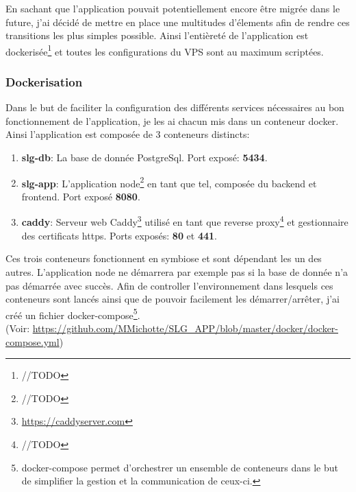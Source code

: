 \newpara

En sachant que l'application pouvait potentiellement encore être migrée dans le future, j'ai décidé de mettre en place une multitudes d'élements afin de rendre ces transitions les plus simples possible. Ainsi l'entièreté de l'application est dockerisée\footnote{//TODO} et toutes les configurations du VPS sont au maximum scriptées. 

\subsubsection{Dockerisation}
Dans le but de faciliter la configuration des différents services nécessaires au bon fonctionnement de l'application, je les ai chacun mis dans un conteneur docker. Ainsi l'application est composée de 3 conteneurs distincts: 

\newpara

\begin{enumerate}
  \item \textbf{slg-db}: La base de donnée PostgreSql. Port exposé: \textbf{5434}.
  \item \textbf{slg-app}: L'application node\footnote{//TODO} en tant que tel, composée du backend et frontend. Port exposé \textbf{8080}. 
  \item \textbf{caddy}: Serveur web Caddy\footnote{\url{https://caddyserver.com}} utilisé en tant que reverse proxy\footnote{//TODO} et gestionnaire des certificats https. Ports exposés: \textbf{80} et \textbf{441}.
\end{enumerate}

\newpage

Ces trois conteneurs fonctionnent en symbiose et sont dépendant les un des autres. L'application node ne démarrera par exemple pas si la base de donnée n'a pas démarrée avec succès. Afin de controller l'environnement dans lesquels ces conteneurs sont lancés ainsi que de pouvoir facilement les démarrer/arrêter, j'ai créé un fichier docker-compose\footnote{docker-compose permet d'orchestrer un ensemble de conteneurs dans le but de simplifier la gestion et la communication de ceux-ci.}. \\ (Voir: \url{https://github.com/MMichotte/SLG_APP/blob/master/docker/docker-compose.yml})


